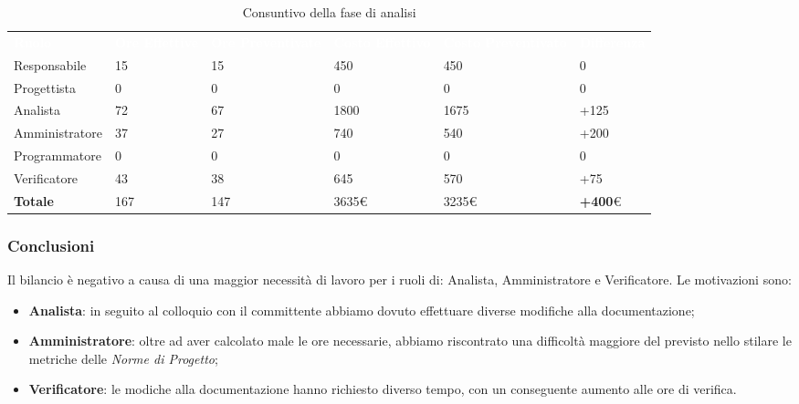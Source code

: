 \begin{table}[H]
\begin{center}
\renewcommand{\arraystretch}{1.5}
\begin{tabular}{ m{}<{\centering}  m{}<{\centering} m{}<{\centering} m{}<{\centering} m{}<{\centering} m{}<{\centering}}
	\rowcolor{darkblue}
	\textcolor{white}{\textbf{Ruolo}} & \textcolor{white}{\textbf{Ore Effettive}} & \textcolor{white}{\textbf{Ore Preventivate}}&\textcolor{white}{\textbf{Costo Effettivo}}&\textcolor{white}{\textbf{Costo Preventivato}}&\textcolor{white}{\textbf{Differenza}}\\ 

	Responsabile  & 15 & 15 & 450 & 450 & 0\\	
	
	Progettista & 0 & 0 & 0 & 0 & 0\\
	
	Analista & 72 & 67 & 1800 & 1675 & +125\\
	
	Amministratore & 37 & 27 & 740 & 540 & +200\\
	
	Programmatore & 0 & 0 &0 &0 & 0\\
	
	Verificatore & 43 & 38 & 645 & 570 & +75\\
	
	\textbf{Totale} & 167 & 147 & 3635\euro & 3235\euro & \textbf{+400}\euro \\
	
\end{tabular}
\caption{Consuntivo della fase di analisi}
\end{center}
\end{table}

\subsubsection{Conclusioni}
Il bilancio è negativo a causa di una maggior necessità di lavoro per i ruoli di: Analista, Amministratore e Verificatore. Le motivazioni sono:
\begin{itemize}
\item \textbf{Analista}: in seguito al colloquio con il committente\glo{} abbiamo dovuto effettuare diverse modifiche alla documentazione;
\item \textbf{Amministratore}: oltre ad aver calcolato male le ore necessarie, abbiamo riscontrato una difficoltà maggiore del previsto nello stilare le metriche delle \textit{Norme di Progetto};
\item \textbf{Verificatore}: le modiche alla documentazione hanno richiesto diverso tempo, con un conseguente aumento alle ore di verifica.
\end{itemize}

